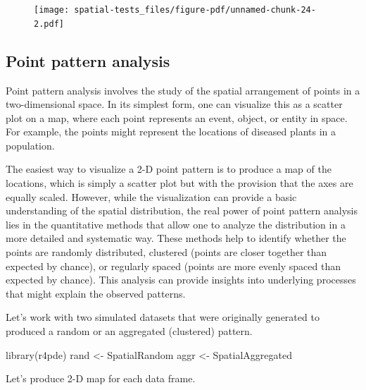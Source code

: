 \documentclass[
  letterpaper,
]{book}
\newenvironment{Shaded}{\begin{snugshade}}{\end{snugshade}}
\newcommand{\FunctionTok}[1]{\textcolor[rgb]{0.28,0.35,0.67}{#1}}
\newcommand{\NormalTok}[1]{\textcolor[rgb]{0.00,0.23,0.31}{#1}}
\newcommand{\OtherTok}[1]{\textcolor[rgb]{0.00,0.23,0.31}{#1}}
\begin{document}
\begin{figure}[H]

{\centering \texttt{[image: spatial-tests\_files/figure-pdf/unnamed-chunk-24-2.pdf]}

}

\end{figure}

\hypertarget{point-pattern-analysis}{%
\subsection{Point pattern analysis}\label{point-pattern-analysis}}

Point pattern analysis involves the study of the spatial arrangement of
points in a two-dimensional space. In its simplest form, one can
visualize this as a scatter plot on a map, where each point represents
an event, object, or entity in space. For example, the points might
represent the locations of diseased plants in a population.

The easiest way to visualize a 2-D point pattern is to produce a map of
the locations, which is simply a scatter plot but with the provision
that the axes are equally scaled. However, while the visualization can
provide a basic understanding of the spatial distribution, the real
power of point pattern analysis lies in the quantitative methods that
allow one to analyze the distribution in a more detailed and systematic
way. These methods help to identify whether the points are randomly
distributed, clustered (points are closer together than expected by
chance), or regularly spaced (points are more evenly spaced than
expected by chance). This analysis can provide insights into underlying
processes that might explain the observed patterns.

Let's work with two simulated datasets that were originally generated to
produced a random or an aggregated (clustered) pattern.

\begin{Shaded}
\begin{Highlighting}[]
\FunctionTok{library}\NormalTok{(r4pde)}
\NormalTok{rand }\OtherTok{\textless{}{-}}\NormalTok{ SpatialRandom}
\NormalTok{aggr }\OtherTok{\textless{}{-}}\NormalTok{ SpatialAggregated}
\end{Highlighting}
\end{Shaded}

Let's produce 2-D map for each data frame.
\end{document}
